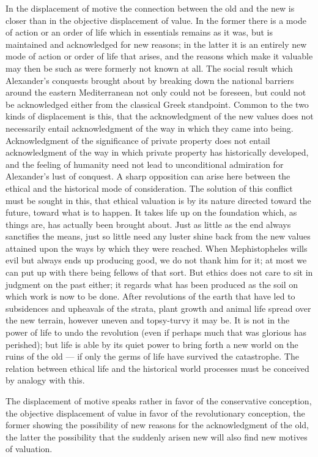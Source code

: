 \documentclass[12pt,a4paper,openany]{book}
\newcommand{\opage}[1]{\marginnote{\footnotesize\textit{[#1]}}}
\begin{document}
In the displacement of motive the connection between the old and the new is closer than in the objective displacement
of value. In the former there is a mode of action or an order of life which in essentials remains as it was, but is
maintained and acknowledged for new reasons; in the latter it is an entirely new mode of action or order of life that
arises, and the reasons which make it valuable may then be such as were formerly not known at all. The social result
which Alexander's conquests brought about by breaking down the national barriers around the eastern Mediterranean not
only could not be foreseen, but could not be acknowledged either from the classical Greek standpoint. Common to the two
kinds of displacement is this, that the acknowledgment of the new values does not necessarily entail acknowledgment of
the way in which they came into being. Acknowledgment of the significance of private property does not entail
acknowledgment of the way in which private property has historically developed, and the feeling of humanity need not
lead to unconditional admiration for Alexander's lust of conquest. A sharp opposition can arise here between the
ethical and the historical mode of consideration. The
\opage{271}solution of this conflict must be sought in this, that ethical valuation is by its nature directed toward the
future, toward what is to happen. It takes life up on the foundation which, as things are, has actually been brought
about. Just as little as the end always sanctifies the means, just so little need any luster shine back from the new
values attained upon the ways by which they were reached. When Mephistopheles wills evil but always ends up producing
good, we do not thank him for it; at most we can put up with there being fellows of that sort. But ethics does not care
to sit in judgment on the past either; it regards what has been produced as the soil on which work is now to be done.
After revolutions of the earth that have led to subsidences and upheavals of the strata, plant growth and animal life
spread over the new terrain, however uneven and topsy-turvy it may be. It is not in the power of life to undo the
revolution (even if perhaps much that was glorious has perished); but life is able by its quiet power to bring forth a
new world on the ruins of the old --- if only the germs of life have survived the catastrophe. The relation between
ethical life and the historical world processes must be conceived by analogy with this.

The displacement of motive speaks rather in favor of the conservative conception, the objective displacement of value
in favor of the revolutionary conception, the former showing the possibility of new reasons for the acknowledgment of
the old, the latter the possibility that the suddenly arisen new will also find new motives of valuation.
\end{document}
